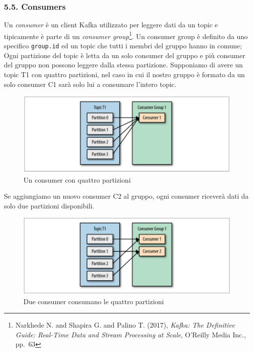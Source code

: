\documentclass[]{article}
\begin{document}
\newpage

\subsubsection{5.5. Consumers}\label{consumers}

Un \emph{consumer} è un client Kafka utilizzato per leggere dati da un
topic e tipicamente è parte di un \emph{consumer group}\footnote{Narkhede
  N. and Shapira G. and Palino T. (2017), \emph{Kafka: The Definitive
  Guide: Real-Time Data and Stream Processing at Scale}, O'Reilly Media
  Inc., pp.~63}. Un consumer group è definito da uno specifico
\texttt{group.id} ed un topic che tutti i membri del gruppo hanno in
comune; Ogni partizione del topic è letta da un solo consumer del gruppo
e più consumer del gruppo non possono leggere dalla stessa partizione.
Supponiamo di avere un topic T1 con quattro partizioni, nel caso in cui
il nostro gruppo è formato da un solo consumer C1 sarà solo lui a
consumare l'intero topic.

\begin{figure}
\centering
\includegraphics[width=1.00000\textwidth]{../images/single-consumer.png}
\caption{Un consumer con quattro partizioni \label{figure_3}}
\end{figure}

Se aggiungiamo un nuovo consumer C2 al gruppo, ogni consumer riceverà
dati da solo due partizioni disponibili.

\begin{figure}
\centering
\includegraphics[width=1.00000\textwidth]{../images/two-consumers.png}
\caption{Due consumer consumano le quattro partizioni \label{figure_3}}
\end{figure}
\end{document}
